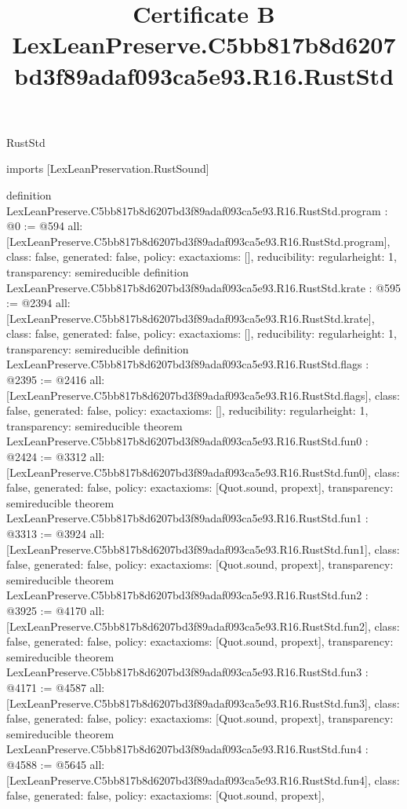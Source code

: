 \begin{lexlean}{RustStd}
\title{Certificate B LexLeanPreserve.C5bb817b8d6207bd3f89adaf093ca5e93.R16.RustStd}
\begin{coremodule}
imports [LexLeanPreservation.RustSound]

definition LexLeanPreserve.C5bb817b8d6207bd3f89adaf093ca5e93.R16.RustStd.program : @0 := @594 {
  all: [LexLeanPreserve.C5bb817b8d6207bd3f89adaf093ca5e93.R16.RustStd.program],
  class: false,
  generated: false,
  policy: exact{axioms: []},
  reducibility: regular{height: 1},
  transparency: semireducible
}
definition LexLeanPreserve.C5bb817b8d6207bd3f89adaf093ca5e93.R16.RustStd.krate : @595 := @2394 {
  all: [LexLeanPreserve.C5bb817b8d6207bd3f89adaf093ca5e93.R16.RustStd.krate],
  class: false,
  generated: false,
  policy: exact{axioms: []},
  reducibility: regular{height: 1},
  transparency: semireducible
}
definition LexLeanPreserve.C5bb817b8d6207bd3f89adaf093ca5e93.R16.RustStd.flags : @2395 := @2416 {
  all: [LexLeanPreserve.C5bb817b8d6207bd3f89adaf093ca5e93.R16.RustStd.flags],
  class: false,
  generated: false,
  policy: exact{axioms: []},
  reducibility: regular{height: 1},
  transparency: semireducible
}
theorem LexLeanPreserve.C5bb817b8d6207bd3f89adaf093ca5e93.R16.RustStd.fun0 : @2424 := @3312 {
  all: [LexLeanPreserve.C5bb817b8d6207bd3f89adaf093ca5e93.R16.RustStd.fun0],
  class: false,
  generated: false,
  policy: exact{axioms: [Quot.sound, propext]},
  transparency: semireducible
}
theorem LexLeanPreserve.C5bb817b8d6207bd3f89adaf093ca5e93.R16.RustStd.fun1 : @3313 := @3924 {
  all: [LexLeanPreserve.C5bb817b8d6207bd3f89adaf093ca5e93.R16.RustStd.fun1],
  class: false,
  generated: false,
  policy: exact{axioms: [Quot.sound, propext]},
  transparency: semireducible
}
theorem LexLeanPreserve.C5bb817b8d6207bd3f89adaf093ca5e93.R16.RustStd.fun2 : @3925 := @4170 {
  all: [LexLeanPreserve.C5bb817b8d6207bd3f89adaf093ca5e93.R16.RustStd.fun2],
  class: false,
  generated: false,
  policy: exact{axioms: [Quot.sound, propext]},
  transparency: semireducible
}
theorem LexLeanPreserve.C5bb817b8d6207bd3f89adaf093ca5e93.R16.RustStd.fun3 : @4171 := @4587 {
  all: [LexLeanPreserve.C5bb817b8d6207bd3f89adaf093ca5e93.R16.RustStd.fun3],
  class: false,
  generated: false,
  policy: exact{axioms: [Quot.sound, propext]},
  transparency: semireducible
}
theorem LexLeanPreserve.C5bb817b8d6207bd3f89adaf093ca5e93.R16.RustStd.fun4 : @4588 := @5645 {
  all: [LexLeanPreserve.C5bb817b8d6207bd3f89adaf093ca5e93.R16.RustStd.fun4],
  class: false,
  generated: false,
  policy: exact{axioms: [Quot.sound, propext]},
}
\end{coremodule}
\end{lexlean}
